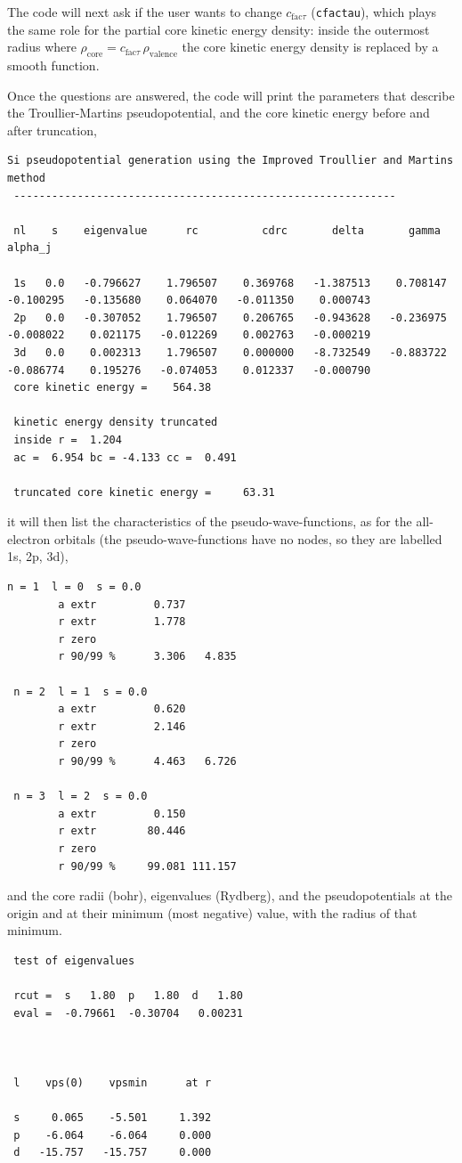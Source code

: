 \documentclass[11pt]{article}
\begin{document}
The code will next ask if the user wants to change $c_{\text{fac}\tau}$ (\texttt{cfactau}),
which plays the same role for the partial core kinetic energy density: inside the outermost
radius where $\rho_\text{core} = c_{\text{fac}\tau}\, \rho_\text{valence}$ the core kinetic
energy density is replaced by a smooth function.

Once the questions are answered, the code will print the
parameters that describe the Troullier-Martins pseudopotential,
and the core kinetic energy before and after truncation,
\begin{verbatim}
Si pseudopotential generation using the Improved Troullier and Martins method
 ------------------------------------------------------------

 nl    s    eigenvalue      rc          cdrc       delta       gamma       alpha_j

 1s   0.0   -0.796627    1.796507    0.369768   -1.387513    0.708147   -0.100295   -0.135680    0.064070   -0.011350    0.000743
 2p   0.0   -0.307052    1.796507    0.206765   -0.943628   -0.236975   -0.008022    0.021175   -0.012269    0.002763   -0.000219
 3d   0.0    0.002313    1.796507    0.000000   -8.732549   -0.883722   -0.086774    0.195276   -0.074053    0.012337   -0.000790
 core kinetic energy =    564.38

 kinetic energy density truncated
 inside r =  1.204
 ac =  6.954 bc = -4.133 cc =  0.491

 truncated core kinetic energy =     63.31
\end{verbatim}
it will then list the characteristics of the pseudo-wave-functions, as for the
all-electron orbitals (the pseudo-wave-functions have no nodes, so they are labelled
1s, 2p, 3d),
\begin{verbatim}
n = 1  l = 0  s = 0.0
        a extr         0.737
        r extr         1.778
        r zero
        r 90/99 %      3.306   4.835

 n = 2  l = 1  s = 0.0
        a extr         0.620
        r extr         2.146
        r zero
        r 90/99 %      4.463   6.726

 n = 3  l = 2  s = 0.0
        a extr         0.150
        r extr        80.446
        r zero
        r 90/99 %     99.081 111.157
\end{verbatim}
and the core radii (bohr), eigenvalues (Rydberg),
and the pseudopotentials at the origin and at their minimum (most negative) value,
with the radius of that minimum.
\begin{verbatim}
 test of eigenvalues

 rcut =  s   1.80  p   1.80  d   1.80
 eval =  -0.79661  -0.30704   0.00231



 l    vps(0)    vpsmin      at r

 s     0.065    -5.501     1.392
 p    -6.064    -6.064     0.000
 d   -15.757   -15.757     0.000
\end{verbatim}
\end{document}
